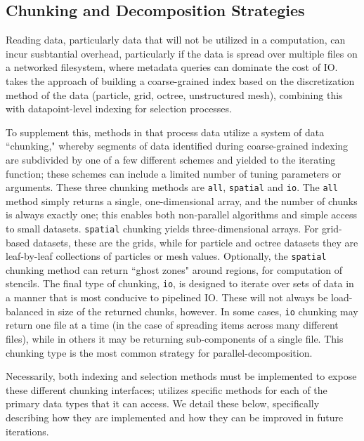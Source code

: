\subsection{Chunking and Decomposition Strategies}


Reading data, particularly data that will not be utilized in a computation, can
incur susbtantial overhead, particularly if the data is spread over multiple
files on a networked filesystem, where metadata queries can dominate the cost
of IO.  \yt{} takes the approach of building a coarse-grained index based on
the discretization method of the data (particle, grid, octree, unstructured
mesh), combining this with datapoint-level indexing for selection processes.

To supplement this, methods in \yt{} that process data utilize a system of data
``chunking," whereby segments of data identified during coarse-grained indexing
are subdivided by one of a few different schemes and yielded to the iterating
function; these schemes can include a limited number of tuning parameters or
arguments.  These three chunking methods are \texttt{all}, \texttt{spatial} and
\texttt{io}.  The \texttt{all} method simply returns a single, one-dimensional
array, and the number of chunks is always exactly one; this enables both
non-parallel algorithms and simple access to small datasets.  \texttt{spatial}
chunking yields three-dimensional arrays.  For grid-based datasets,
these are the grids, while for particle and octree datasets they are
leaf-by-leaf collections of particles or mesh values.  Optionally, the
\texttt{spatial} chunking method can return ``ghost zones" around regions, for
computation of stencils.  The final type of chunking, \texttt{io}, is designed
to iterate over sets of data in a manner that is most conducive to pipelined
IO.  These will not always be load-balanced in size of the returned chunks,
however.  In some cases, \texttt{io} chunking may return one file at a time (in
the case of spreading items across many different files), while in others it
may be returning sub-components of a single file.  This chunking type is the
most common strategy for parallel-decomposition.

Necessarily, both indexing and selection methods must be implemented to expose
these different chunking interfaces; \yt{} utilizes specific methods for each
of the primary data types that it can access.  We detail these below,
specifically describing how they are implemented and how they can be improved
in future iterations.

